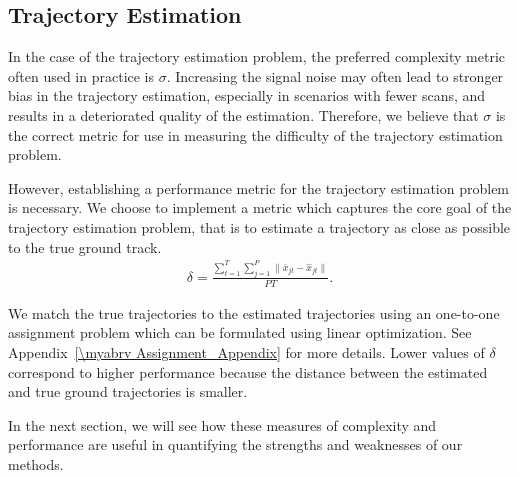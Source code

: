 \subsection{Trajectory Estimation}
In the case of the trajectory estimation problem, the preferred complexity metric often used in practice is $\sigma$. Increasing the signal noise may often lead to stronger bias in the trajectory estimation, especially in scenarios with fewer scans, and results in a deteriorated quality of the estimation. Therefore, we believe that $\sigma$ is the correct metric for use in measuring the difficulty of the trajectory estimation problem. 

However, establishing a performance metric for the trajectory estimation problem is necessary. We choose to implement a metric which captures the core goal of the trajectory estimation problem, that is to estimate a trajectory as close as possible to the true ground track. 
\begin{align*}
	\delta = \frac{\sum\limits_{t=1}^{T}\sum\limits_{j=1}^{P}\| \bar{x}_{jt} - \hat{x}_{jt} \|}{PT}.
\end{align*}

We match the true trajectories to the estimated trajectories using an one-to-one assignment problem which can be formulated using linear optimization. See Appendix~\ref{\myabrv Assignment_Appendix} for more details. Lower values of $\delta$ correspond to higher performance because the distance between the estimated and true ground trajectories is smaller. 

In the next section, we will see how these measures of complexity and performance are useful in quantifying the strengths and weaknesses of our methods.
